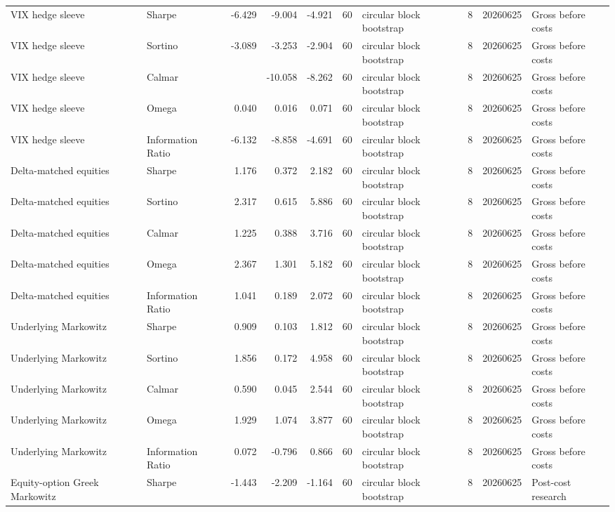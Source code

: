 \begin{tabular}{llrrrrlrrl}
VIX hedge sleeve & Sharpe & -6.429 & -9.004 & -4.921 & 60 & circular block bootstrap & 8 & 20260625 & Gross before costs \\
VIX hedge sleeve & Sortino & -3.089 & -3.253 & -2.904 & 60 & circular block bootstrap & 8 & 20260625 & Gross before costs \\
VIX hedge sleeve & Calmar &  & -10.058 & -8.262 & 60 & circular block bootstrap & 8 & 20260625 & Gross before costs \\
VIX hedge sleeve & Omega & 0.040 & 0.016 & 0.071 & 60 & circular block bootstrap & 8 & 20260625 & Gross before costs \\
VIX hedge sleeve & Information Ratio & -6.132 & -8.858 & -4.691 & 60 & circular block bootstrap & 8 & 20260625 & Gross before costs \\
Delta-matched equities & Sharpe & 1.176 & 0.372 & 2.182 & 60 & circular block bootstrap & 8 & 20260625 & Gross before costs \\
Delta-matched equities & Sortino & 2.317 & 0.615 & 5.886 & 60 & circular block bootstrap & 8 & 20260625 & Gross before costs \\
Delta-matched equities & Calmar & 1.225 & 0.388 & 3.716 & 60 & circular block bootstrap & 8 & 20260625 & Gross before costs \\
Delta-matched equities & Omega & 2.367 & 1.301 & 5.182 & 60 & circular block bootstrap & 8 & 20260625 & Gross before costs \\
Delta-matched equities & Information Ratio & 1.041 & 0.189 & 2.072 & 60 & circular block bootstrap & 8 & 20260625 & Gross before costs \\
Underlying Markowitz & Sharpe & 0.909 & 0.103 & 1.812 & 60 & circular block bootstrap & 8 & 20260625 & Gross before costs \\
Underlying Markowitz & Sortino & 1.856 & 0.172 & 4.958 & 60 & circular block bootstrap & 8 & 20260625 & Gross before costs \\
Underlying Markowitz & Calmar & 0.590 & 0.045 & 2.544 & 60 & circular block bootstrap & 8 & 20260625 & Gross before costs \\
Underlying Markowitz & Omega & 1.929 & 1.074 & 3.877 & 60 & circular block bootstrap & 8 & 20260625 & Gross before costs \\
Underlying Markowitz & Information Ratio & 0.072 & -0.796 & 0.866 & 60 & circular block bootstrap & 8 & 20260625 & Gross before costs \\
Equity-option Greek Markowitz & Sharpe & -1.443 & -2.209 & -1.164 & 60 & circular block bootstrap & 8 & 20260625 & Post-cost research \\

\end{tabular}
